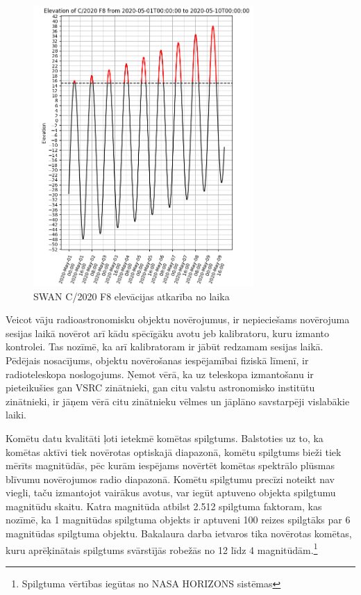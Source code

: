 \begin{figure}[H]
\centering
\includegraphics[width=0.75\textwidth]{images/created/swan-smaller.png}
\caption{SWAN C/2020 F8 elevācijas atkarība no laika}

\label{fig:swan-el}
\end{figure}



Veicot vāju radioastronomisku objektu novērojumus, ir nepieciešams novērojuma sesijas laikā novērot arī kādu spēcīgāku avotu jeb kalibratoru, kuru izmanto kontrolei. Tas nozīmē, ka arī kalibratoram ir jābūt redzamam sesijas laikā. Pēdējais nosacījums, objektu novērošanas iespējamībai fiziskā līmenī, ir radioteleskopa noslogojums. Ņemot vērā, ka uz teleskopa izmantošanu ir pieteikušies gan VSRC zinātnieki, gan citu valstu astronomisko institūtu zinātnieki, ir jāņem vērā citu zinātnieku vēlmes un jāplāno savstarpēji vislabākie laiki. 

Komētu datu kvalitāti ļoti ietekmē komētas spilgtums. 
Balstoties uz to, ka komētas aktīvi tiek novērotas optiskajā diapazonā, komētu spilgtums bieži tiek mērīts magnitūdās, pēc kurām iespējams novērtēt komētas spektrālo plūsmas blīvumu novērojumos radio diapazonā. Komētu spilgtumu precīzi noteikt nav viegli, taču izmantojot vairākus avotus, var iegūt aptuveno objekta spilgtumu magnitūdu skaitu. 
Katra magnitūda atbilst 2.512 spilgtuma faktoram, kas nozīmē, ka 1 magnitūdas spilgtuma objekts ir aptuveni 100 reizes spilgtāks par 6 magnitūdas spilgtuma objektu. Bakalaura darba ietvaros tika novērotas komētas, kuru aprēķinātais spilgtums svārstījās robežās no 12 līdz 4 magnitūdām.\footnote{Spilgtuma vērtības iegūtas no NASA HORIZONS sistēmas}

